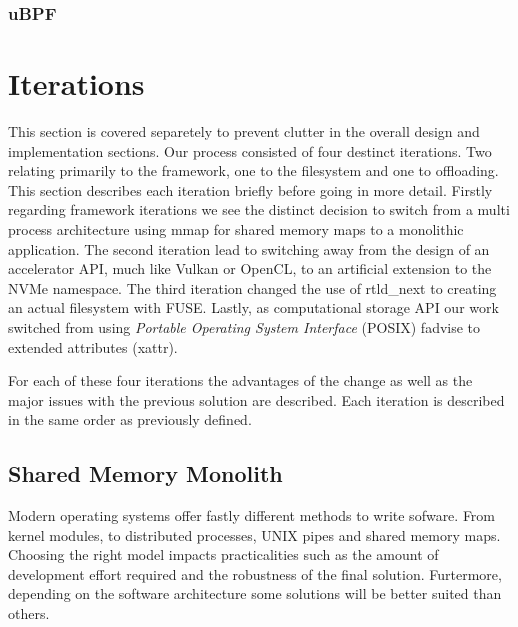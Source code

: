


\subsubsection{uBPF}


\section{Iterations}

This section is covered separetely to prevent clutter in the overall design and
implementation sections. Our process consisted of four destinct iterations.
Two relating primarily to the framework, one to the filesystem and one to
offloading. This section describes each iteration briefly before going in more
detail. Firstly regarding framework iterations we see the distinct decision
to switch from a multi process architecture using mmap for shared memory maps to
a monolithic application. The second iteration lead to switching away from the
design of an accelerator API, much like Vulkan \cite{vulkan} or OpenCL, to an
artificial extension to the NVMe namespace. The third iteration changed the use
of rtld\_next \cite{rtldnext} to creating an actual filesystem with FUSE.
Lastly, as computational storage API our work switched from using
\textit{Portable Operating System Interface} (POSIX) fadvise \cite{fadvise} to
extended attributes (xattr).

For each of these four iterations the advantages of the change as well as the
major issues with the previous solution are described. Each iteration is
described in the same order as previously defined.

\subsection{Shared Memory Monolith}

Modern operating systems offer fastly different methods to write sofware. From
kernel modules, to distributed processes, UNIX pipes and shared memory maps.
Choosing the right model impacts practicalities such as the amount of
development effort required and the robustness of the final solution. 
Furtermore, depending on the software architecture some solutions will be better
suited than others.

